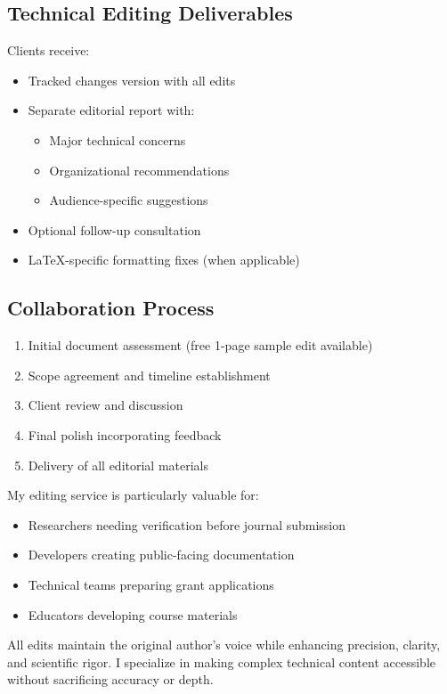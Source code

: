 \documentclass[11pt]{article}
\begin{document}
\subsection*{Technical Editing Deliverables}

Clients receive:

\begin{itemize}
\item Tracked changes version with all edits
\item Separate editorial report with:
  \begin{itemize}
  \item Major technical concerns
  \item Organizational recommendations
  \item Audience-specific suggestions
  \end{itemize}
\item Optional follow-up consultation
\item LaTeX-specific formatting fixes (when applicable)
\end{itemize}

\subsection*{Collaboration Process}

\begin{enumerate}
\item Initial document assessment (free 1-page sample edit available)
\item Scope agreement and timeline establishment
\item Client review and discussion
\item Final polish incorporating feedback
\item Delivery of all editorial materials
\end{enumerate}

My editing service is particularly valuable for:
\begin{itemize}
\item Researchers needing verification before journal submission
\item Developers creating public-facing documentation
\item Technical teams preparing grant applications
\item Educators developing course materials
\end{itemize}

All edits maintain the original author's voice while enhancing precision, clarity, and scientific rigor. I specialize in making complex technical content accessible without sacrificing accuracy or depth.
\end{document}
